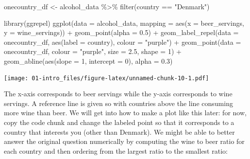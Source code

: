 \documentclass[
]{book}
\newenvironment{Shaded}{\begin{snugshade}}{\end{snugshade}}
\newcommand{\AttributeTok}[1]{\textcolor[rgb]{0.77,0.63,0.00}{#1}}
\newcommand{\DecValTok}[1]{\textcolor[rgb]{0.00,0.00,0.81}{#1}}
\newcommand{\FloatTok}[1]{\textcolor[rgb]{0.00,0.00,0.81}{#1}}
\newcommand{\FunctionTok}[1]{\textcolor[rgb]{0.00,0.00,0.00}{#1}}
\newcommand{\NormalTok}[1]{#1}
\newcommand{\OtherTok}[1]{\textcolor[rgb]{0.56,0.35,0.01}{#1}}
\newcommand{\SpecialCharTok}[1]{\textcolor[rgb]{0.00,0.00,0.00}{#1}}
\newcommand{\StringTok}[1]{\textcolor[rgb]{0.31,0.60,0.02}{#1}}
\begin{document}
\begin{Shaded}
\begin{Highlighting}[]
\NormalTok{onecountry\_df }\OtherTok{\textless{}{-}}\NormalTok{ alcohol\_data }\SpecialCharTok{\%\textgreater{}\%} 
  \FunctionTok{filter}\NormalTok{(country }\SpecialCharTok{==} \StringTok{"Denmark"}\NormalTok{)}

\FunctionTok{library}\NormalTok{(ggrepel)}
\FunctionTok{ggplot}\NormalTok{(}\AttributeTok{data =}\NormalTok{ alcohol\_data,}
       \AttributeTok{mapping =} \FunctionTok{aes}\NormalTok{(}\AttributeTok{x =}\NormalTok{ beer\_servings, }\AttributeTok{y =}\NormalTok{ wine\_servings)) }\SpecialCharTok{+} 
  \FunctionTok{geom\_point}\NormalTok{(}\AttributeTok{alpha =} \FloatTok{0.5}\NormalTok{) }\SpecialCharTok{+}
  \FunctionTok{geom\_label\_repel}\NormalTok{(}\AttributeTok{data =}\NormalTok{ onecountry\_df, }\FunctionTok{aes}\NormalTok{(}\AttributeTok{label =}\NormalTok{ country),}
    \AttributeTok{colour =} \StringTok{"purple"}\NormalTok{) }\SpecialCharTok{+}
  \FunctionTok{geom\_point}\NormalTok{(}\AttributeTok{data =}\NormalTok{ onecountry\_df, }\AttributeTok{colour =} \StringTok{"purple"}\NormalTok{,}
             \AttributeTok{size =} \FloatTok{2.5}\NormalTok{, }\AttributeTok{shape =} \DecValTok{1}\NormalTok{) }\SpecialCharTok{+}
  \FunctionTok{geom\_abline}\NormalTok{(}\FunctionTok{aes}\NormalTok{(}\AttributeTok{slope =} \DecValTok{1}\NormalTok{, }\AttributeTok{intercept =} \DecValTok{0}\NormalTok{), }\AttributeTok{alpha =} \FloatTok{0.3}\NormalTok{)}
\end{Highlighting}
\end{Shaded}

\texttt{[image: 01-intro\_files/figure-latex/unnamed-chunk-10-1.pdf]}

The x-axis corresponds to beer servings while the y-axis corresponds to wine servings. A reference line is given so with countries above the line consuming more wine than beer. We will get into how to make a plot like this later: for now, copy the code chunk and change the labeled point so that it corresponds to a country that interests you (other than Denmark).
We might be able to better answer the original question numerically by computing the wine to beer ratio for each country and then ordering from the largest ratio to the smallest ratio:
\end{document}

